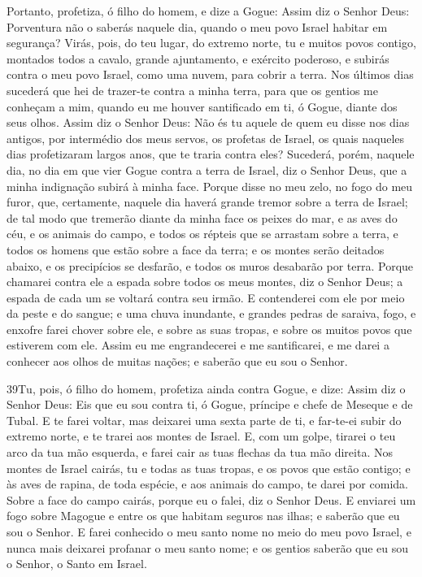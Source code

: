 Portanto, profetiza, ó filho do homem, e dize a Gogue: Assim diz
o Senhor Deus: Porventura não o saberás naquele dia, quando o meu
povo Israel habitar em segurança? Virás, pois, do teu lugar,
do extremo norte, tu e muitos povos contigo, montados todos a
cavalo, grande ajuntamento, e exército poderoso, e subirás
contra o meu povo Israel, como uma nuvem, para cobrir a terra. Nos
últimos dias sucederá que hei de trazer-te contra a minha terra,
para que os gentios me conheçam a mim, quando eu me houver
santificado em ti, ó Gogue, diante dos seus olhos. Assim diz
o Senhor Deus: Não és tu aquele de quem eu disse nos dias antigos,
por intermédio dos meus servos, os profetas de Israel, os quais
naqueles dias profetizaram largos anos, que te traria contra eles?
Sucederá, porém, naquele dia, no dia em que vier Gogue contra
a terra de Israel, diz o Senhor Deus, que a minha indignação subirá
à minha face. Porque disse no meu zelo, no fogo do meu furor,
que, certamente, naquele dia haverá grande tremor sobre a terra de
Israel; de tal modo que tremerão diante da minha face os
peixes do mar, e as aves do céu, e os animais do campo, e todos os
répteis que se arrastam sobre a terra, e todos os homens que estão
sobre a face da terra; e os montes serão deitados abaixo, e os
precipícios se desfarão, e todos os muros desabarão por terra.
Porque chamarei contra ele a espada sobre todos os meus
montes, diz o Senhor Deus; a espada de cada um se voltará contra seu
irmão. E contenderei com ele por meio da peste e do sangue; e
uma chuva inundante, e grandes pedras de saraiva, fogo, e enxofre
farei chover sobre ele, e sobre as suas tropas, e sobre os muitos
povos que estiverem com ele. Assim eu me engrandecerei e me
santificarei, e me darei a conhecer aos olhos de muitas nações; e
saberão que eu sou o Senhor.

\medskip

\lettrine{39} Tu, pois, ó filho do homem, profetiza ainda
contra Gogue, e dize: Assim diz o Senhor Deus: Eis que eu sou contra
ti, ó Gogue, príncipe e chefe de Meseque e de Tubal. E te farei
voltar, mas deixarei uma sexta parte de ti, e far-te-ei subir do
extremo norte, e te trarei aos montes de Israel. E, com um
golpe, tirarei o teu arco da tua mão esquerda, e farei cair as tuas
flechas da tua mão direita. Nos montes de Israel cairás, tu e
todas as tuas tropas, e os povos que estão contigo; e às aves de
rapina, de toda espécie, e aos animais do campo, te darei por
comida. Sobre a face do campo cairás, porque eu o falei, diz o
Senhor Deus. E enviarei um fogo sobre Magogue e entre os que
habitam seguros nas ilhas; e saberão que eu sou o Senhor. E
farei conhecido o meu santo nome no meio do meu povo Israel, e nunca
mais deixarei profanar o meu santo nome; e os gentios saberão que eu
sou o Senhor, o Santo em Israel.

